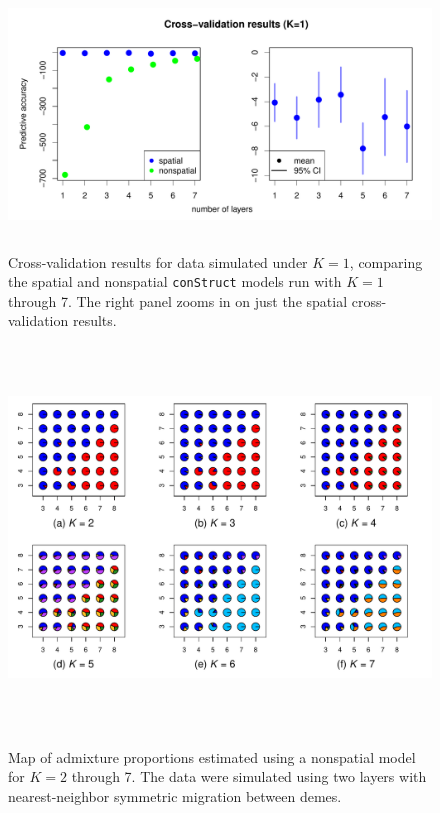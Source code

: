 \documentclass[10pt,letterpaper]{article}
\begin{document}
\begin{figure}
	\centering
		{\includegraphics[width=5in,height=2.5in]{figs/sims/simK1_std_xval.pdf}}
		\caption{
			Cross-validation results for data simulated under $K=1$,
			comparing the spatial and nonspatial \texttt{conStruct} models run with $K=1$ through 7.  
			The right panel zooms in on just the spatial cross-validation results.
		}\label{simK1_xval}
\end{figure}


\newpage
\begin{figure}
	\centering
		{\includegraphics[width=6in,height=4in]{figs/sims/simK2_nsp_pies.pdf}}
	\caption{
	Map of admixture proportions estimated using a nonspatial model for $K=2$ through 7.
	The data were simulated using two layers with nearest-neighbor symmetric migration between demes.
    }\label{simK2_nsp_pies}
\end{figure}
\end{document}
